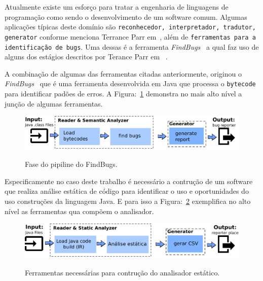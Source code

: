 Atualmente existe um esforço para tratar a engenharia de linguagens de programação como sendo o desenvolvimento de um software comum. Algumas aplicações típicas deste domínio são \texttt{reconhecedor, interpretador, tradutor, generator} conforme menciona Terrance Parr em~\cite{Parr:2009:LIP:1823613},  além de \texttt{ferramentas para a identificação de bugs}. Uma dessas é a ferramenta \textit{FindBugs}~\cite{FindBugs} a qual faz uso de alguns dos estágios descritos por Terance Parr em ~\cite{Parr:2009:LIP:1823613}.

A combinação de algumas das ferramentas citadas anteriormente, originou o \textit{FindBugs}~\cite{FindBugs} que é uma ferramenta desenvolvida em Java que processa o \texttt{bytecode} para identificar padões de erros. A Figura:~\ref{fig:findBugs} demonstra no mais alto nível a junção de algumas ferramentas. 

\begin{figure}[h]
	\center
	\includegraphics[scale=0.9]{Imagens/pipelineFindbugs}
	\label{fig:findBugs}
	\caption{Fase do pipiline do FindBugs.}
\end{figure}

Especificamente no caso deste trabalho é necessário a contrução de um software que realiza análise estática de código para identificar o uso e oportunidades do uso construções da linguagem Java. E para isso a Figura:~\ref{fig:stagesAnalyzer} exemplifica no alto nível as ferramentas qua compõem o analisador.

\begin{figure}[h]
	\center
	\includegraphics[scale=0.9]{Imagens/stagesAnalizer}
	\label{fig:stagesAnalyzer}
	\caption{Ferramentas necessárias para contrução do analisador estático.}
\end{figure}

